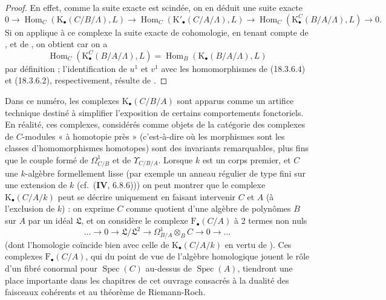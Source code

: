 \begin{proof}
En effet, comme la suite exacte  est scindée, on en
déduit une suite exacte
\[
  0\to\operatorname{Hom}_C(\mathrm{K}_\bullet(C/B/\Lambda),L)\to
  \operatorname{Hom}_C(\mathrm{K}'_\bullet(C/A/\Lambda),L)\to
  \operatorname{Hom}_C(\mathrm{K}^C_\bullet(B/A/\Lambda),L)\to0.
\]
Si on applique à ce complexe la suite exacte de cohomologie, en tenant compte
de , et de , on obtient
 car on a
\[
  \operatorname{Hom}_C(\mathrm{K}^C_\bullet(B/A/\Lambda),L)
  =\operatorname{Hom}_B(\mathrm{K}_\bullet(B/A/\Lambda),L)
\]
par définition ; l'identification de $u^1$ et $v^1$ avec les homomorphismes
de (18.3.6.4) et (18.3.6.2), respectivement, résulte de .
\end{proof}

\begin{remark}[20.6.26]
\label{0.20.6.26-fr}
Dans ce numéro, les complexes $\mathrm{K}_\bullet(C/B/A)$ sont apparus comme
un artifice technique destiné à simplifier l'exposition de certains
comportements fonctoriels. En réalité, ces complexes, considérés comme objets
de la catégorie des
complexes de $C$-modules « à homotopie près » (c'est-à-dire où les morphismes
sont les classes d'homomorphismes homotopes) sont des invariants remarquables,
plus fins que le couple formé de $\Omega^1_{C/B}$ et de
$\Upsilon_{C/B/A}$. Lorsque $k$ est un corps premier, et $C$ une $k$-algèbre
formellement lisse (par exemple un anneau régulier de type fini sur une
extension de $k$ (cf.\ ($\mathbf{IV}$, 6.8.6))) on peut montrer que le
complexe $\mathrm{K}_\bullet(C/A/k)$ peut se décrire uniquement en faisant
intervenir $C$ et $A$ (à l'exclusion de $k$) : on exprime $C$ comme quotient
d'une algèbre de polynômes $B$ sur $A$ par un idéal $\mathfrak{L}$, et on
considère le complexe $\mathrm{F}_\bullet(C/A)$ à 2 termes non nuls
\[
  \ldots\to0\to\mathfrak{L}/\mathfrak{L}^2\to
  \Omega^1_{B/A}\otimes_B C\to0\to\ldots
\]
(dont l'homologie coïncide bien avec celle de
$\mathrm{K}_\bullet(C/A/k)$ en vertu de ). Ces
complexes $\mathrm{F}_\bullet(C/A)$, qui du point de vue de l'algèbre
homologique jouent le rôle d'un fibré conormal pour $\operatorname{Spec}(C)$
au-dessus de $\operatorname{Spec}(A)$, tiendront une place importante dans
les chapitres de cet ouvrage consacrés à la dualité des faisceaux cohérents et
au théorème de Riemann-Roch.
\end{remark}

